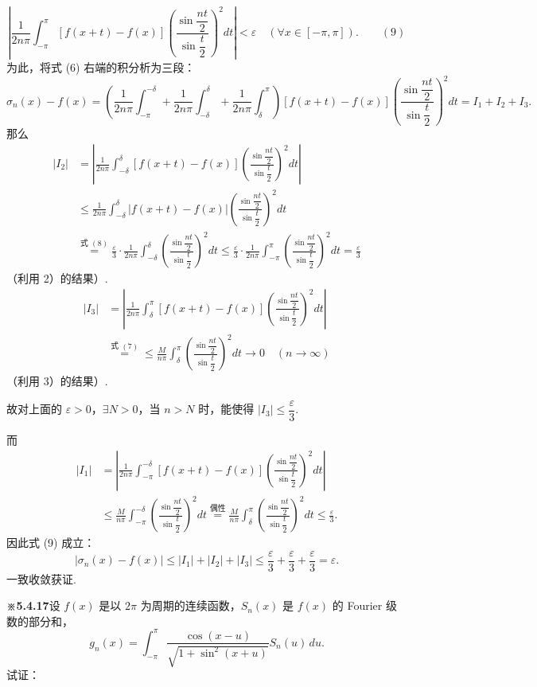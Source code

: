 \documentclass[UTF8, 12pt, fontset=fandol, oneside]{ctexart}
\providecommand{\xlongequal}[1]{\stackrel{#1}{=}}
\begin{document}
\[
  \left|\frac1{2n\pi}\int_{-\pi}^{\pi}[f(x+t)-f(x)]
  \left(\frac{\sin\dfrac{nt}{2}}{\sin\dfrac t2}\right)^2dt\right|
  <\varepsilon\quad(\forall x\in[-\pi,\pi]). \qquad(9)
\]
为此，将式 (6) 右端的积分析为三段：
\[
  \sigma_n(x)-f(x)=
  \left(\frac1{2n\pi}\int_{-\pi}^{-\delta}
  +\frac1{2n\pi}\int_{-\delta}^{\delta}
  +\frac1{2n\pi}\int_{\delta}^{\pi}\right)
  [f(x+t)-f(x)]
  \left(\frac{\sin\dfrac{nt}{2}}{\sin\dfrac t2}\right)^2dt
  =I_1+I_2+I_3.
\]
那么
\[
\begin{aligned}
|I_2|
&=\left|\frac1{2n\pi}\int_{-\delta}^{\delta}[f(x+t)-f(x)]
\left(\frac{\sin\dfrac{nt}{2}}{\sin\dfrac t2}\right)^2dt\right|\\
&\le\frac1{2n\pi}\int_{-\delta}^{\delta}|f(x+t)-f(x)|
\left(\frac{\sin\dfrac{nt}{2}}{\sin\dfrac t2}\right)^2dt\\
&\xlongequal{\text{式 }(8)}
\frac{\varepsilon}{3}\cdot\frac1{2n\pi}\int_{-\delta}^{\delta}
\left(\frac{\sin\dfrac{nt}{2}}{\sin\dfrac t2}\right)^2dt
\le\frac{\varepsilon}{3}\cdot\frac1{2n\pi}\int_{-\pi}^{\pi}
\left(\frac{\sin\dfrac{nt}{2}}{\sin\dfrac t2}\right)^2dt
=\frac{\varepsilon}{3}
\end{aligned}
\]
（利用 2）的结果）.
\[
\begin{aligned}
|I_3|
&=\left|\frac1{2n\pi}\int_{\delta}^{\pi}[f(x+t)-f(x)]
\left(\frac{\sin\dfrac{nt}{2}}{\sin\dfrac t2}\right)^2dt\right|\\
&\xlongequal{\text{式 }(7)}
\le\frac{M}{n\pi}\int_{\delta}^{\pi}
\left(\frac{\sin\dfrac{nt}{2}}{\sin\dfrac t2}\right)^2dt\to0\quad(n\to\infty)
\end{aligned}
\]
（利用 3）的结果）.

故对上面的 $\varepsilon>0$，$\exists N>0$，当 $n>N$ 时，能使得
$|I_3|\le\dfrac{\varepsilon}{3}$.

而
\[
\begin{aligned}
|I_1|
&=\left|\frac1{2n\pi}\int_{-\pi}^{-\delta}[f(x+t)-f(x)]
\left(\frac{\sin\dfrac{nt}{2}}{\sin\dfrac t2}\right)^2dt\right|\\
&\le\frac{M}{n\pi}\int_{-\pi}^{-\delta}
\left(\frac{\sin\dfrac{nt}{2}}{\sin\dfrac t2}\right)^2dt
\xlongequal{\text{偶性}}
\frac{M}{n\pi}\int_{\delta}^{\pi}
\left(\frac{\sin\dfrac{nt}{2}}{\sin\dfrac t2}\right)^2dt
\le\frac{\varepsilon}{3}.
\end{aligned}
\]
因此式 (9) 成立：
\[
  |\sigma_n(x)-f(x)|\le |I_1|+|I_2|+|I_3|
  \le\frac{\varepsilon}{3}+\frac{\varepsilon}{3}+\frac{\varepsilon}{3}=\varepsilon.
\]
一致收敛获证.

\noindent\textbf{※5.4.17}\quad 设 $f(x)$ 是以 $2\pi$ 为周期的连续函数，$S_n(x)$ 是 $f(x)$ 的 Fourier 级数的部分和，
\[
  g_n(x)=\int_{-\pi}^{\pi}
  \frac{\cos(x-u)}{\sqrt{1+\sin^2(x+u)}}S_n(u)\,du.
\]
试证：
\end{document}
